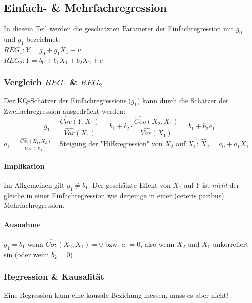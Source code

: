 \documentclass[a3paper, 8pt]{extarticle}
\begin{document}
\begin{multicols*}{5}
\subsection{Einfach- \& Mehrfachregression}
In diesem Teil werden die geschätzten Parameter der Einfachregression mit $g_0$ und $g_1$ bezeichnet:\\
\vspace{5pt}
$REG_1: Y=g_0+g_1X_1+u$\\
$REG_2: Y=b_0+b_1X_1+b_2X_2+e$

\subsubsection{Vergleich $REG_1$ \& $REG_2$}


Der KQ-Schätzer der Einfachregressions ($g_1$) kann durch die Schätzer der Zweifachregression ausgedrückt werden:
$$g_1=\frac{\widehat{Cov}(Y,X_1)}{\widehat{Var}(X_1)}=b_1+b_2 \cdot \frac{\widehat{Cov}(X_2,X_1)}{\widehat{Var}(X_1)}=b_1+b_2a_1$$
$a_1=\frac{\widehat{Cov}(X_1,X_2)}{\widehat{Var}(X_1)}$= Steigung der  "Hilfsregression" von $X_2$ auf $X_1$: $\hat{X}_2=a_0+a_1X_1$


\paragraph{Implikation} Im Allgemeinen gilt $g_1 \neq b_1$. Der geschätzte Effekt von $X_1$ auf $Y$ ist \textit{nicht} der gleiche in einer Einfachregression wie derjenige in einer (ceteris paribus) Mehrfachregression.

\paragraph{Ausnahme} $g_1=b_1$ wenn $\widehat{Cov}(X_2,X_1)=0$ bzw. $a_1=0$, also wenn $X_2$ und $X_1$ unkorreliert sin (oder wenn $b_2 = 0$)

\subsubsection{Regression \& Kausalität}
Eine Regression kann eine kausale Beziehung messen, muss es aber nicht! 


\end{multicols*}
\end{document}
